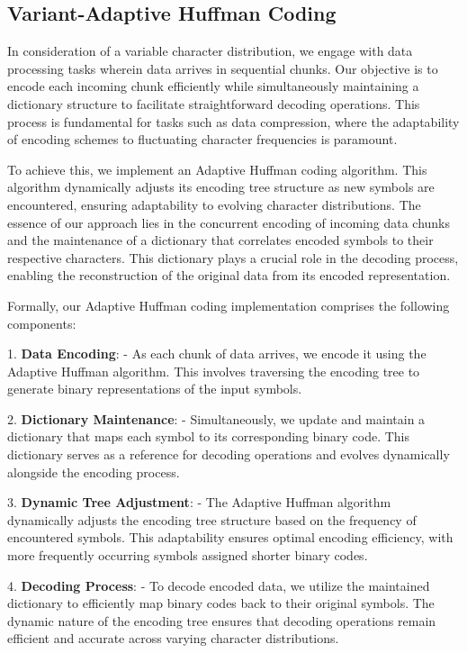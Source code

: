 \documentclass[scrartcl]{article}
\begin{document}
\subsection{Variant-Adaptive Huffman Coding}
 
In consideration of a variable character distribution, we engage with data processing tasks wherein data arrives in sequential chunks. Our objective is to encode each incoming chunk efficiently while simultaneously maintaining a dictionary structure to facilitate straightforward decoding operations. This process is fundamental for tasks such as data compression, where the adaptability of encoding schemes to fluctuating character frequencies is paramount.

To achieve this, we implement an Adaptive Huffman coding algorithm. This algorithm dynamically adjusts its encoding tree structure as new symbols are encountered, ensuring adaptability to evolving character distributions. The essence of our approach lies in the concurrent encoding of incoming data chunks and the maintenance of a dictionary that correlates encoded symbols to their respective characters. This dictionary plays a crucial role in the decoding process, enabling the reconstruction of the original data from its encoded representation.

Formally, our Adaptive Huffman coding implementation comprises the following components:

1. \textbf{Data Encoding}:
   - As each chunk of data arrives, we encode it using the Adaptive Huffman algorithm. This involves traversing the encoding tree to generate binary representations of the input symbols.

2. \textbf{Dictionary Maintenance}:
   - Simultaneously, we update and maintain a dictionary that maps each symbol to its corresponding binary code. This dictionary serves as a reference for decoding operations and evolves dynamically alongside the encoding process.

3. \textbf{Dynamic Tree Adjustment}:
   - The Adaptive Huffman algorithm dynamically adjusts the encoding tree structure based on the frequency of encountered symbols. This adaptability ensures optimal encoding efficiency, with more frequently occurring symbols assigned shorter binary codes.

4. \textbf{Decoding Process}:
   - To decode encoded data, we utilize the maintained dictionary to efficiently map binary codes back to their original symbols. The dynamic nature of the encoding tree ensures that decoding operations remain efficient and accurate across varying character distributions.
\end{document}
